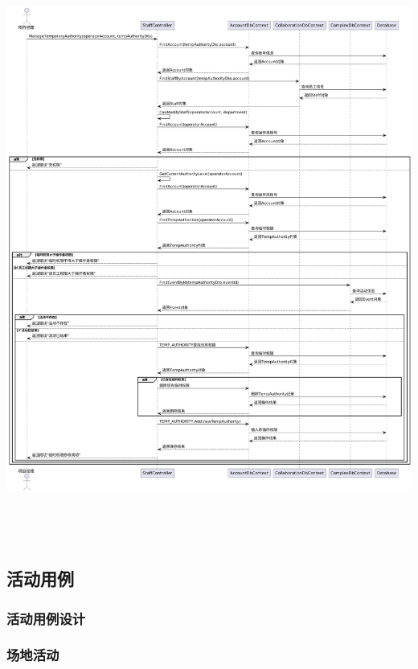 \documentclass[]{article}
\begin{document}
\includegraphics[width=6.28194in,height=7.52361in]{media/media/image19.png}

\hypertarget{ux6d3bux52a8ux7528ux4f8b}{%
\subsection{活动用例}\label{ux6d3bux52a8ux7528ux4f8b}}

\hypertarget{ux6d3bux52a8ux7528ux4f8bux8bbeux8ba1}{%
\subsubsection{活动用例设计}\label{ux6d3bux52a8ux7528ux4f8bux8bbeux8ba1}}

\subsubsection{场地活动}
\end{document}
